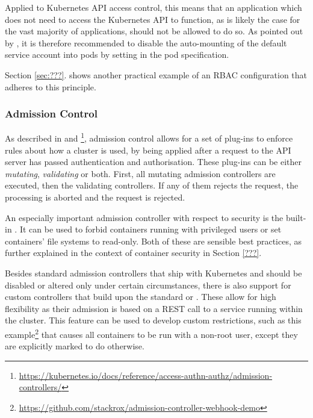 Applied to Kubernetes API access control, this means that an application which does not need to access the Kubernetes API to function, as is likely the case for the vast majority of applications, should not be allowed to do so. As pointed out by \textcite{kubernetessecurity}, it is therefore recommended to disable the auto-mounting of the default service account into pods by setting  in the pod specification. 



Section \ref{sec:???}. shows another practical example of an RBAC configuration that adheres to this principle.



\subsubsection{Admission Control} \label{admissionControl}

As described in \cite{admissionControl} and \cite{k8sdocs}\footnote{\url{https://kubernetes.io/docs/reference/access-authn-authz/admission-controllers/}}, admission control allows for a set of plug-ins to enforce rules about how a cluster is used, by being applied after a request to the API server has passed authentication and authorisation. These plug-ins can be either \textit{mutating}, \textit{validating} or both. First, all mutating admission controllers are executed, then the validating controllers. If any of them rejects the request, the processing is aborted and the request is rejected.

An especially important admission controller with respect to security is the built-in . It can be used to forbid containers running with privileged users or set containers' file systems to read-only. Both of these are sensible best practices, as further explained in the context of container security in Section \ref{???}. %

Besides standard admission controllers that ship with Kubernetes and should be disabled or altered only under certain circumstances, there is also support for custom controllers that build upon the standard  or . These allow for high flexibility as their admission is based on a REST call to a service running within the cluster. This feature can be used to develop custom restrictions, such as this example\footnote{\url{https://github.com/stackrox/admission-controller-webhook-demo}} that causes all containers to be run with a non-root user, except they are explicitly marked to do otherwise. 

